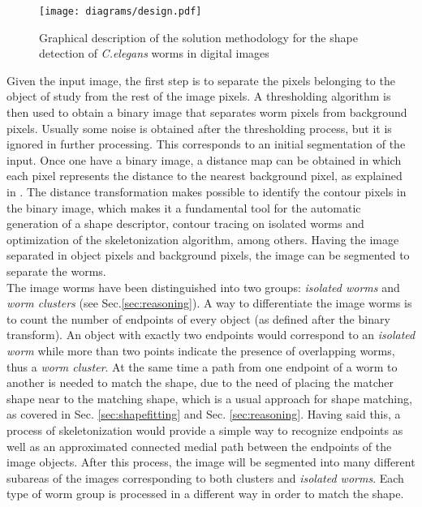 \begin{figure}[h t b p ! H]
 \centering
   \texttt{[image: diagrams/design.pdf]}
 \caption{Graphical description of the solution methodology for the shape detection
 of \emph{C.elegans} worms in digital images}
\label{fig:methsol}
\end{figure}

Given the input image, the first step is to separate the pixels belonging to the object
of study from the rest of the image pixels. A thresholding algorithm is then used to
obtain a binary image that separates worm pixels from background pixels. Usually some
noise is obtained after the thresholding process, but it is ignored in further processing.
This corresponds to an initial segmentation of the input. Once one have a binary image, a
distance map can be obtained in which each pixel represents the distance to the 
nearest background pixel, as explained in \cite{dtresearch}. The distance transformation
makes possible to identify the contour pixels in the binary image, which makes it a fundamental
tool for the automatic generation of a shape descriptor, contour tracing on isolated worms 
and optimization of the skeletonization algorithm, among others. Having the image 
separated in object pixels and background pixels, the image can be segmented to separate
the worms. \\

The image worms have been distinguished into two groups: \emph{isolated worms}
and \emph{worm clusters} (see Sec.\ref{sec:reasoning}). A way to differentiate the image worms
is to count the number of endpoints of every object (as defined after the binary transform).
An object with exactly two endpoints would correspond to an \emph{isolated worm} while
more than two points indicate the presence of overlapping worms, thus a \emph{worm cluster}.
At the same time a path from one endpoint of a worm to another is needed to match
the shape, due to the need of placing the matcher shape near to the matching shape, which
is a usual approach for shape matching, as covered in Sec. \ref{sec:shapefitting} and
Sec. \ref{sec:reasoning}. Having said this, a process of skeletonization would provide a simple
way to recognize endpoints as well as an approximated connected medial path between the
endpoints of the image objects. After this process, the image will be segmented into 
many different subareas of the images corresponding to both clusters and \emph{isolated
worms}. Each type of worm group is processed in a different way in order to match
the shape.\\

